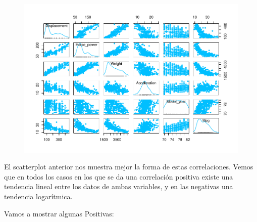 \begin{figure}[H]\includegraphics[width=.9\linewidth]{img/EDA_files/figure-latex/unnamed-chunk-20-1} \caption{}\end{figure}

El scatterplot anterior nos muestra mejor la forma de estas correlaciones. Vemos que en todos los casos en los que se da una correlación positiva existe una tendencia lineal entre los datos de ambas variables, y en las negativas una tendencia logarítmica.

Vamos a mostrar algunas Positivas:

